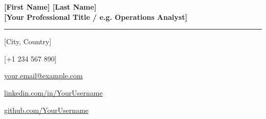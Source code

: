 \documentclass[10pt,a4paper]{article}
\newcommand{\cvsidebarsect}[1]{
	\vspace{4mm}
	\noindent{\large\bfseries\textcolor{sidebartitle}{#1}}
	\vspace{1mm}\par
	\noindent\textcolor{sidebartitle!40}{\rule{\linewidth}{0.5pt}}\par
	\vspace{2mm}
}
\begin{document}
	\pagestyle{empty}
	
	\noindent
	\begin{minipage}[t]{6cm}
		\vspace*{0pt}
		
		\begin{center}
		\end{center}
		
		\vspace{1.5mm}
		
		\begin{center}
			{\LARGE \textbf{\textcolor{sidebartitle}{[First Name] [Last Name]}}}\\[2.5mm]
			{\footnotesize \textbf{\textcolor{accent}{[Your Professional Title / e.g. Operations Analyst]}}}
		\end{center}
		
		\cvsidebarsect{Contact}
		\noindent\textcolor{accent}{\small \faMapMarker*} \quad \textcolor{sidebartext}{\footnotesize [City, Country]} \par\vspace{1.5mm}
		\noindent\textcolor{accent}{\small \faPhone} \quad \textcolor{sidebartext}{\footnotesize [+1 234 567 890]} \par\vspace{1.5mm}
		\noindent\textcolor{accent}{\small \faEnvelope} \quad \href{mailto:your.email@example.com}{\textcolor{sidebartext}{\footnotesize your.email@example.com}} \par\vspace{1.5mm}
		\noindent\textcolor{accent}{\small \faLinkedin} \quad \href{https://linkedin.com/in/YourUsername}{\textcolor{sidebartext}{\footnotesize linkedin.com/in/YourUsername}} \par\vspace{1.5mm}
		\noindent\textcolor{accent}{\small \faGithub} \quad \href{https://github.com/YourUsername}{\textcolor{sidebartext}{\footnotesize github.com/YourUsername}} \par\vspace{1.5mm}
		

\end{minipage}
\end{document}
